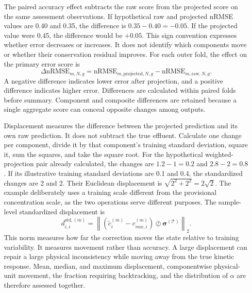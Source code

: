 The paired accuracy effect subtracts the raw score from the projected score on the same assessment observations. If hypothetical raw and projected nRMSE values are 0.40 and 0.35, the difference is $0.35-0.40=-0.05$. If the projected value were 0.45, the difference would be $+0.05$. This sign convention expresses whether error decreases or increases. It does not identify which components move or whether their conservation residual improves. For each outer fold, the effect on the primary error score is
\begin{equation}
\Delta\mathrm{nRMSE}_{m,N,g}=
\mathrm{nRMSE}_{m,\mathrm{projected},N,g}
-\mathrm{nRMSE}_{m,\mathrm{raw},N,g}.
\label{eq:projection_paired_error_difference}
\end{equation}
A negative difference indicates lower error after projection, and a positive difference indicates higher error. Differences are calculated within paired folds before summary. Component and composite differences are retained because a single aggregate score can conceal opposite changes among outputs.

Displacement measures the difference between the projected prediction and its own raw prediction. It does not subtract the true effluent. Calculate one change per component, divide it by that component's training standard deviation, square it, sum the squares, and take the square root. For the hypothetical weighted-projection pair already calculated, the changes are $1.2-1=0.2$ and $2.8-2=0.8$. If its illustrative training standard deviations are 0.1 and 0.4, the standardized changes are 2 and 2. Their Euclidean displacement is $\sqrt{2^2+2^2}=2\sqrt2$. The example deliberately uses a training scale different from the provisional concentration scale, as the two operations serve different purposes. The sample-level standardized displacement is
\begin{equation}
d_{c,i}^{\mathrm{std},(m)}=
\left\|(\tilde c_i^{(m)}-c_{raw,i}^{(m)})
\oslash\boldsymbol{\sigma}^{(\mathcal{T})}\right\|_2.
\label{eq:projection_standardized_displacement}
\end{equation}
This norm measures how far the correction moves the state relative to training variability. It measures movement rather than accuracy. A large displacement can repair a large physical inconsistency while moving away from the true kinetic response. Mean, median, and maximum displacement, componentwise physical-unit movement, the fraction requiring backtracking, and the distribution of $\alpha$ are therefore assessed together.

